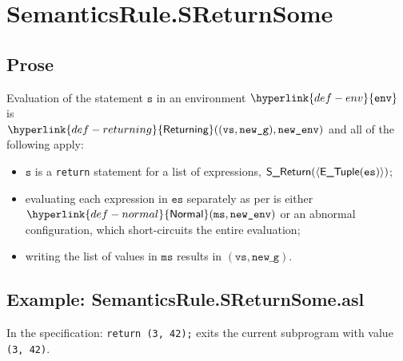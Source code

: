 \documentclass{book}
\newcommand\ProseOrAbnormal[0]{or an abnormal configuration, which short-circuits the entire evaluation}
\newcommand\Normal[0]{\hyperlink{def-normal}{\textsf{Normal}}}
\newcommand\Returning[0]{\hyperlink{def-returning}{\textsf{Returning}}}
\newcommand\env[0]{\hyperlink{def-env}{\texttt{env}}}
\newcommand\newg[0]{\texttt{new\_g}}
\newcommand\vs[0]{\texttt{s}}
\newcommand\vvs[0]{\texttt{vs}}
\newcommand\vms[0]{\texttt{ms}}
\newcommand\es[0]{\texttt{es}}
\newcommand\ms[0]{\texttt{ms}}
\begin{document}

\section{SemanticsRule.SReturnSome \label{sec:SemanticsRule.SReturnSome}}
    \subsection{Prose}
    Evaluation of the statement $\vs$ in an environment $\env$ is \\
    $\Returning((\vvs, \newg), \newenv)$ and all of the following apply:
    \begin{itemize}
    \item $\vs$ is a \texttt{return} statement for a list of expressions, $\SReturn(\langle\ETuple(\es)\rangle)$;
    \item evaluating each expression in $\es$ separately as per 
    is either \\ $\Normal(\ms, \newenv)$ \ProseOrAbnormal;
    \item writing the list of values in $\vms$ results in $(\vvs, \newg)$.
    \end{itemize}

    \subsection{Example: SemanticsRule.SReturnSome.asl}
    In the specification:
    \texttt{return (3, 42);} exits the current subprogram with value \texttt{(3, 42)}.


\end{document}

